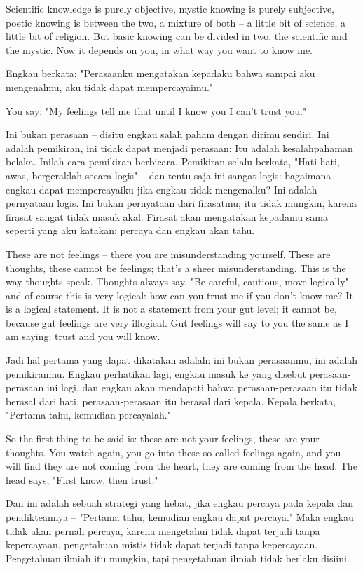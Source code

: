 \english
Scientific knowledge is purely objective, mystic knowing is purely subjective, poetic knowing is between the two, a mixture of both -- a little bit of science, a little bit of religion. But basic knowing can be divided in two, the scientific and the mystic. Now it depends on you, in what way you want to know me.

\bahasa
Engkau berkata: "Perasaanku mengatakan kepadaku bahwa sampai aku mengenalmu, aku tidak dapat mempercayaimu."

\english
You say: "My feelings tell me that until I know you I can't trust you."

\bahasa
Ini bukan perasaan -- disitu engkau salah paham dengan dirimu sendiri. Ini adalah pemikiran, ini tidak dapat menjadi perasaan; Itu adalah kesalahpahaman belaka. Inilah cara pemikiran berbicara. Pemikiran selalu berkata, "Hati-hati, awas, bergeraklah secara logis" -- dan tentu saja ini sangat logis: bagaimana engkau dapat mempercayaiku jika engkau tidak mengenalku? Ini adalah pernyataan logis. Ini bukan pernyataan dari firasatmu; itu tidak mungkin, karena firasat sangat tidak masuk akal. Firasat akan mengatakan kepadamu sama seperti yang aku katakan: percaya dan engkau akan tahu.

\english
These are not feelings -- there you are misunderstanding yourself. These are thoughts, these cannot be feelings; that's a sheer misunderstanding. This is the way thoughts speak. Thoughts always say, "Be careful, cautious, move logically" -- and of course this is very logical: how can you trust me if you don't know me? It is a logical statement. It is not a statement from your gut level; it cannot be, because gut feelings are very illogical. Gut feelings will say to you the same as I am saying: trust and you will know.

\bahasa
Jadi hal pertama yang dapat dikatakan adalah: ini bukan perasaanmu, ini adalah pemikiranmu. Engkau perhatikan lagi, engkau masuk ke yang disebut perasaan-perasaan ini lagi, dan engkau akan mendapati bahwa perasaan-perasaan itu tidak berasal dari hati, perasaan-perasaan itu berasal dari kepala. Kepala berkata, "Pertama tahu, kemudian percayalah."

\english
So the first thing to be said is: these are not your feelings, these are your thoughts. You watch again, you go into these so-called feelings again, and you will find they are not coming from the heart, they are coming from the head. The head says, "First know, then trust."

\bahasa
Dan ini adalah sebuah strategi yang hebat, jika engkau percaya pada kepala dan pendikteannya -- "Pertama tahu, kemudian engkau dapat percaya." Maka engkau tidak akan pernah percaya, karena mengetahui tidak dapat terjadi tanpa kepercayaan, pengetahuan mistis tidak dapat terjadi tanpa kepercayaan. Pengetahuan ilmiah itu mungkin, tapi pengetahuan ilmiah tidak berlaku disiini.

